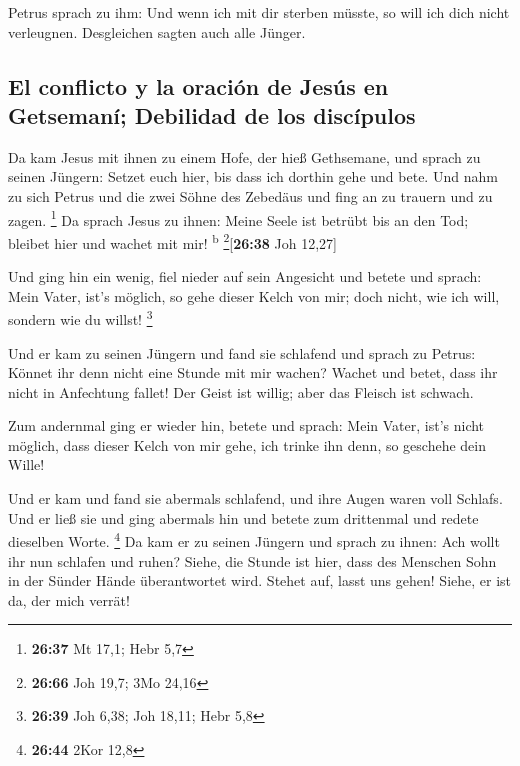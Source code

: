  Petrus sprach zu ihm: Und wenn ich mit dir sterben
müsste, so will ich dich nicht verleugnen. Desgleichen sagten auch alle
Jünger.

\hypertarget{el-conflicto-y-la-oraciuxf3n-de-jesuxfas-en-getsemanuxed-debilidad-de-los-discuxedpulos}{%
\subsection{El conflicto y la oración de Jesús en Getsemaní; Debilidad
de los
discípulos}\label{el-conflicto-y-la-oraciuxf3n-de-jesuxfas-en-getsemanuxed-debilidad-de-los-discuxedpulos}}

 Da kam Jesus mit ihnen zu einem Hofe, der hieß
Gethsemane, und sprach zu seinen Jüngern: Setzet euch hier, bis dass ich
dorthin gehe und bete.  Und nahm zu sich Petrus und die
zwei Söhne des Zebedäus und fing an zu trauern und zu zagen. \footnote{\textbf{26:37}
  Mt 17,1; Hebr 5,7}  Da sprach Jesus zu ihnen: Meine
Seele ist betrübt bis an den Tod; bleibet hier und wachet mit mir!
\textsuperscript{b} \footnote{\textbf{26:66} Joh 19,7; 3Mo 24,16}{[}\textbf{26:38}
Joh 12,27{]}

 Und ging hin ein wenig, fiel nieder auf sein Angesicht
und betete und sprach: Mein Vater, ist's möglich, so gehe dieser Kelch
von mir; doch nicht, wie ich will, sondern wie du willst! \footnote{\textbf{26:39}
  Joh 6,38; Joh 18,11; Hebr 5,8}

 Und er kam zu seinen Jüngern und fand sie schlafend und
sprach zu Petrus: Könnet ihr denn nicht eine Stunde mit mir wachen?
 Wachet und betet, dass ihr nicht in Anfechtung fallet!
Der Geist ist willig; aber das Fleisch ist schwach.

 Zum andernmal ging er wieder hin, betete und sprach:
Mein Vater, ist's nicht möglich, dass dieser Kelch von mir gehe, ich
trinke ihn denn, so geschehe dein Wille!

 Und er kam und fand sie abermals schlafend, und ihre
Augen waren voll Schlafs.  Und er ließ sie und ging
abermals hin und betete zum drittenmal und redete dieselben Worte.
\footnote{\textbf{26:44} 2Kor 12,8}  Da kam er zu seinen
Jüngern und sprach zu ihnen: Ach wollt ihr nun schlafen und ruhen?
Siehe, die Stunde ist hier, dass des Menschen Sohn in der Sünder Hände
überantwortet wird.  Stehet auf, lasst uns gehen! Siehe,
er ist da, der mich verrät!


